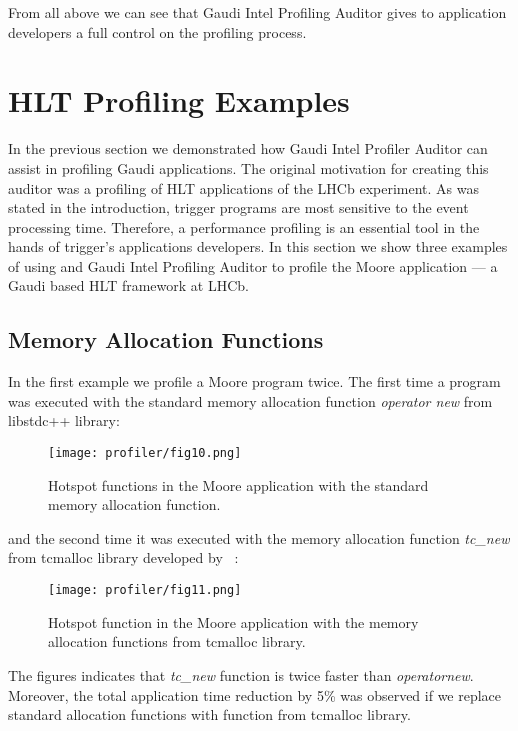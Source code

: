 From all above we can see that Gaudi Intel Profiling Auditor gives to
application developers a full control on the profiling process.


\section{HLT Profiling Examples}

In the previous section we demonstrated how Gaudi Intel Profiler Auditor can
assist  in profiling Gaudi applications. The original motivation for creating
this auditor was a profiling of HLT applications of the LHCb experiment. As was
stated in the introduction, trigger programs are most sensitive to the event
processing time. Therefore, a performance profiling is an essential tool in the
hands of trigger's applications developers. In this section we show three
examples of using \amp and Gaudi Intel Profiling Auditor to profile the Moore
application --- a Gaudi based HLT framework at LHCb.

\subsection{Memory Allocation Functions}

In the first example we profile a Moore program twice. The first time a program
was executed with the standard memory allocation function {\it operator new}
from libstdc++ library:

\begin{figure}[H]
\begin{minipage}{\textwidth}
\texttt{[image: profiler/fig10.png]}
\caption{\label{fig10}Hotspot functions in the Moore application with the standard memory allocation function.}
\end{minipage}
\end{figure}

and the second time it was executed with the memory allocation function {\it
tc\_new} from tcmalloc library developed by \google~\cite{perftools}:
~
\begin{figure}[H]
\begin{minipage}{\textwidth}
\texttt{[image: profiler/fig11.png]}
\caption{\label{fig11}Hotspot function in the Moore application with the memory allocation functions from tcmalloc 
library.}
\end{minipage}
\end{figure}

The figures indicates that {\it tc\_new} function is twice faster than {\it
operatornew}. Moreover, the total application time reduction by 5\% was
observed if we replace standard allocation functions with function from
tcmalloc library.

